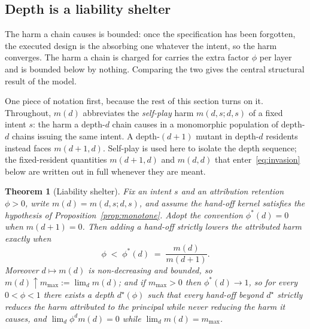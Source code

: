 \documentclass[a4paper,fleqn]{cas-sc}
\newtheorem{theorem}{Theorem}
\begin{document}
\subsection{Depth is a liability shelter}
\label{sec:shelter}

The harm a chain causes is bounded: once the specification has been forgotten,
the executed design is the absorbing one whatever the intent, so the harm
converges. The harm a chain is charged for carries the extra factor $\phi$ per
layer and is bounded below by nothing. Comparing the two gives the central
structural result of the model.

One piece of notation first, because the rest of this section turns on it.
Throughout, $m(d)$ abbreviates the \emph{self-play} harm
$m(d,s;d,s)$ of a fixed intent $s$: the harm a depth-$d$ chain causes in a
monomorphic population of depth-$d$ chains issuing the same intent. A
depth-$(d+1)$ mutant in depth-$d$ residents instead faces $m(d{+}1,d)$.
Self-play is used here to isolate the depth sequence; the fixed-resident
quantities $m(d{+}1,d)$ and $m(d,d)$ that enter~\eqref{eq:invasion} below are
written out in full whenever they are meant.

\begin{theorem}[Liability shelter]
\label{thm:shelter}
Fix an intent $s$ and an attribution retention $\phi>0$, write
$m(d)=m(d,s;d,s)$, and assume the hand-off kernel
satisfies the hypothesis of Proposition~\ref{prop:monotone}. Adopt the
convention $\phi^{*}(d)=0$ when $m(d+1)=0$. Then adding a hand-off strictly
lowers the attributed harm exactly when
\begin{equation}
  \phi \;<\; \phi^{*}(d) \;=\; \frac{m(d)}{m(d+1)}.
  \label{eq:phistar}
\end{equation}
Moreover $d\mapsto m(d)$ is non-decreasing and bounded, so $m(d)\uparrow
m_{\max}:=\lim_{d}m(d)$; and if $m_{\max}>0$ then $\phi^{*}(d)\to1$, so for
every $0<\phi<1$ there exists a depth $d^{\star}(\phi)$ such that every hand-off
beyond $d^{\star}$ strictly reduces the harm attributed to the principal while
never reducing the harm it causes, and $\lim_{d}\phi^{d}m(d)=0$ while
$\lim_{d}m(d)=m_{\max}$.
\end{theorem}
\end{document}
